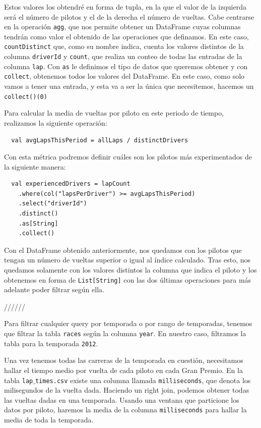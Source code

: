 \documentclass[12pt,twoside,titlepage]{report}
\begin{document}
Estos valores los obtendré en forma de tupla, en la que el valor de la izquierda será el número de pilotos y el de la derecha el número de vueltas. Cabe centrarse en la operación \texttt{agg}, que nos permite obtener un DataFrame cuyas columnas tendrán como valor el obtenido de las operaciones que definamos. En este caso, \texttt{countDistinct} que, como su nombre indica, cuenta los valores distintos de la columna \texttt{driverId} y \texttt{count}, que realiza un conteo de todas las entradas de la columna \texttt{lap}. Con \texttt{as} le definimos el tipo de datos que queremos obtener y con \texttt{collect}, obtenemos todos los valores del DataFrame. En este caso, como solo vamos a tener una entrada, y esta va a ser la única que necesitemos, hacemos un \texttt{collect()(0)}

Para calcular la media de vueltas por piloto en este periodo de tiempo, realizamos la siguiente operación:

\begin{lstlisting}
  val avgLapsThisPeriod = allLaps / distinctDrivers
\end{lstlisting}

Con esta métrica podremos definir cuáles son los pilotos más experimentados de la siguiente manera:

\begin{lstlisting}
  val experiencedDrivers = lapCount
    .where(col("lapsPerDriver") >= avgLapsThisPeriod)
    .select("driverId")
    .distinct()
    .as[String]
    .collect()
\end{lstlisting}

Con el DataFrame obtenido anteriormente, nos quedamos con los pilotos que tengan un número de vueltas superior o igual al índice calculado. Tras esto, nos quedamos solamente con los valores distintos la columna que indica el piloto y los obtenemos en forma de \texttt{List[String]} con las dos últimas operaciones para más adelante poder filtrar según ella.







//////

Para filtrar cualquier query por temporada o por rango de temporadas, tenemos que filtrar la tabla \texttt{races} según la columna \texttt{year}. En nuestro caso, filtramos la tabla para la temporada \texttt{2012}.

Una vez tenemos todas las carreras de la temporada en cuestión, necesitamos hallar el tiempo medio por vuelta de cada piloto en cada Gran Premio. En la tabla \texttt{lap$\_$times.csv} existe una columna llamada \texttt{milliseconds}, que denota los milisegundos de la vuelta dada. Haciendo un right join, podemos obtener todas las vueltas dadas en una temporada. Usando una ventana que particione los datos por piloto, haremos la media de la columna \texttt{milliseconds} para hallar la media de toda la temporada.
\end{document}
